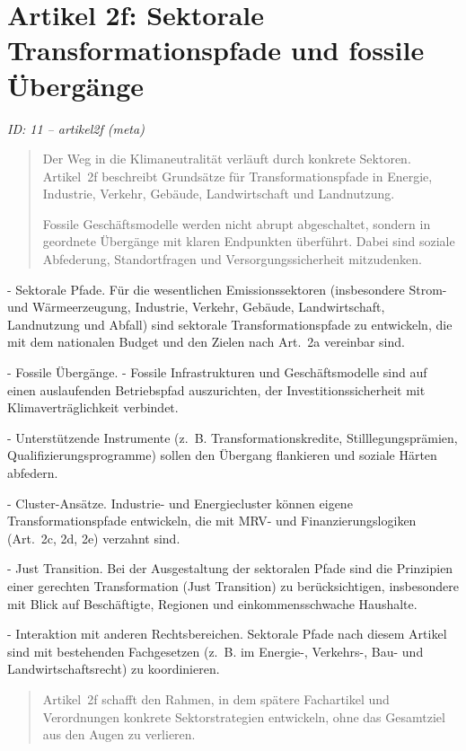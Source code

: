 \documentclass[12pt,a4paper]{scrartcl}
\begin{document}
\section[Artikel 2f: Sektorale Transformationspfade und fossile Übergänge]{Artikel 2f: Sektorale Transformationspfade und fossile Übergänge}
\noindent\textit{ID: 11 -- artikel2f (meta)}

\begin{quote}
Der Weg in die Klimaneutralität verläuft durch konkrete Sektoren. Artikel 2f beschreibt Grundsätze für Transformationspfade in Energie, Industrie, Verkehr, Gebäude, Landwirtschaft und Landnutzung.

Fossile Geschäftsmodelle werden nicht abrupt abgeschaltet, sondern in geordnete Übergänge mit klaren Endpunkten überführt. Dabei sind soziale Abfederung, Standortfragen und Versorgungssicherheit mitzudenken.
\end{quote}

- Sektorale Pfade. Für die wesentlichen Emissionssektoren (insbesondere Strom- und Wärmeerzeugung, Industrie, Verkehr, Gebäude, Landwirtschaft, Landnutzung und Abfall) sind sektorale Transformationspfade zu entwickeln, die mit dem nationalen Budget und den Zielen nach Art. 2a vereinbar sind.

- Fossile Übergänge.
- Fossile Infrastrukturen und Geschäftsmodelle sind auf einen auslaufenden Betriebspfad auszurichten, der Investitionssicherheit mit Klimaverträglichkeit verbindet.

- Unterstützende Instrumente (z. B. Transformationskredite, Stilllegungsprämien, Qualifizierungsprogramme) sollen den Übergang flankieren und soziale Härten abfedern.

- Cluster-Ansätze. Industrie- und Energiecluster können eigene Transformationspfade entwickeln, die mit MRV- und Finanzierungslogiken (Art. 2c, 2d, 2e) verzahnt sind.

- Just Transition. Bei der Ausgestaltung der sektoralen Pfade sind die Prinzipien einer gerechten Transformation (Just Transition) zu berücksichtigen, insbesondere mit Blick auf Beschäftigte, Regionen und einkommensschwache Haushalte.

- Interaktion mit anderen Rechtsbereichen. Sektorale Pfade nach diesem Artikel sind mit bestehenden Fachgesetzen (z. B. im Energie-, Verkehrs-, Bau- und Landwirtschaftsrecht) zu koordinieren.

{\footnotesize\begin{quote}
Artikel 2f schafft den Rahmen, in dem spätere Fachartikel und Verordnungen konkrete Sektorstrategien entwickeln, ohne das Gesamtziel aus den Augen zu verlieren.
\end{quote}}
\end{document}
